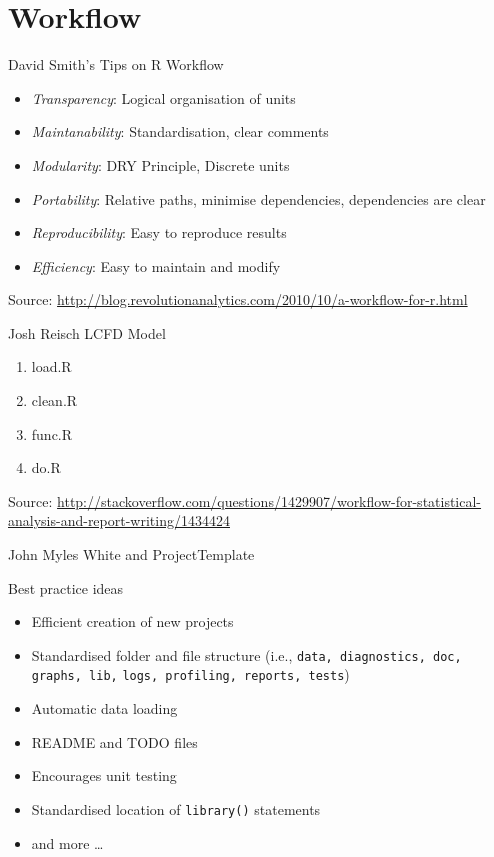 \section{Workflow}
\begin{frame}{David Smith's Tips on R Workflow}
\begin{itemize}
  \item \emph{Transparency}: 
  	Logical organisation of units
  \item \emph{Maintanability}: 
  	Standardisation, clear comments
  \item \emph{Modularity}: 
  	DRY Principle, Discrete units
  \item \emph{Portability}: 
  Relative paths, minimise dependencies, dependencies are clear
  \item \emph{Reproducibility}: 
  Easy to reproduce results
  \item \emph{Efficiency}: 
  Easy to maintain and modify
\end{itemize}


{\tiny Source: \url{http://blog.revolutionanalytics.com/2010/10/a-workflow-for-r.html}}
\end{frame}

\begin{frame}{Josh Reisch LCFD Model}
\begin{enumerate}
\item load.R
\item clean.R
\item func.R
\item do.R 
\end{enumerate} 

{ \tiny Source: 
\url{http://stackoverflow.com/questions/1429907/workflow-for-statistical-analysis-and-report-writing/1434424}}

\end{frame}
 
\begin{frame}[containsverbatim]{John Myles White and ProjectTemplate}
\begin{block}{Best practice ideas}
\begin{itemize}
  \item Efficient creation of new projects
  \item Standardised folder and file structure 
  (i.e., \verb+data, diagnostics, doc, graphs, lib,+
  \verb+logs, profiling, reports, tests+) 
  \item Automatic data loading
  \item README and TODO files
  \item Encourages unit testing
  \item Standardised location of \verb+library()+ statements
  \item and more \ldots 
\end{itemize} 
\end{block}
\end{frame}


